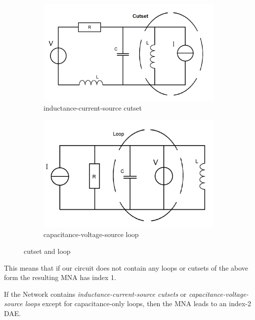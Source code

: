 \begin{figure}[H]
	\begin{subfigure}{0.5\textwidth}
		\centering
		\includegraphics[width=0.9\linewidth]{pictures/inductance-current-source_cutset.png}
		\caption{inductance-current-source cutset}
	\end{subfigure}
	\begin{subfigure}{0.5\textwidth}
		\centering
		\includegraphics[width=0.9\linewidth]{pictures/capacitance-voltage-source_loop.png}
		\caption{capacitance-voltage-source loop}
	\end{subfigure}
	\label{cutset and loop}
	\caption{cutset and loop}
\end{figure}

This means that if our circuit does not contain any loops or cutsets of the above form the resulting MNA has index 1.

\begin{theorem} \cite{Tischendorf2005Topological} \label{Index-2 condition}
	If the Network contains \emph{inductance-current-source cutsets} or \emph{capacitance-voltage-source loops} except for capacitance-only loops, then the MNA leads to an index-2 DAE.
\end{theorem}

